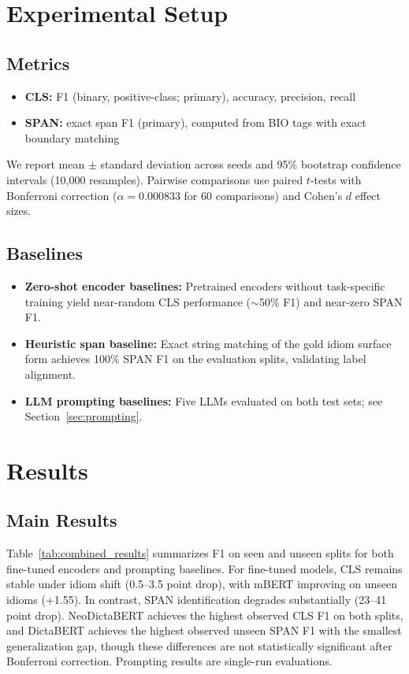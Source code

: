 \documentclass[11pt]{article}
\begin{document}
\section{Experimental Setup}

\subsection{Metrics}

\begin{itemize}
    \item \textbf{CLS:} F1 (binary, positive-class; primary), accuracy, precision, recall
    \item \textbf{SPAN:} exact span F1 (primary), computed from BIO tags with exact boundary matching
\end{itemize}

We report mean $\pm$ standard deviation across seeds and 95\% bootstrap confidence intervals (10,000 resamples). Pairwise comparisons use paired $t$-tests with Bonferroni correction ($\alpha = 0.000833$ for 60 comparisons) and Cohen's $d$ effect sizes.

\subsection{Baselines}

\begin{itemize}
    \item \textbf{Zero-shot encoder baselines:} Pretrained encoders without task-specific training yield near-random CLS performance ($\sim$50\% F1) and near-zero SPAN F1.
    \item \textbf{Heuristic span baseline:} Exact string matching of the gold idiom surface form achieves 100\% SPAN F1 on the evaluation splits, validating label alignment.
    \item \textbf{LLM prompting baselines:} Five LLMs evaluated on both test sets; see Section~\ref{sec:prompting}.
\end{itemize}

\section{Results}

\subsection{Main Results}

Table~\ref{tab:combined_results} summarizes F1 on seen and unseen splits for both fine-tuned encoders and prompting baselines. For fine-tuned models, CLS remains stable under idiom shift (0.5--3.5 point drop), with mBERT improving on unseen idioms (+1.55). In contrast, SPAN identification degrades substantially (23--41 point drop). NeoDictaBERT achieves the highest observed CLS F1 on both splits, and DictaBERT achieves the highest observed unseen SPAN F1 with the smallest generalization gap, though these differences are not statistically significant after Bonferroni correction. Prompting results are single-run evaluations.
\end{document}
